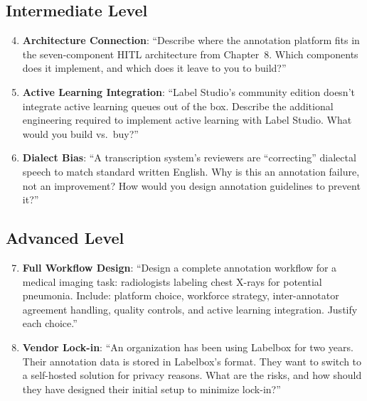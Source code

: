 \subsection{Intermediate Level}

\begin{enumerate}
    \setcounter{enumi}{3}
    \item \textbf{Architecture Connection}: ``Describe where the annotation platform fits in the seven-component HITL architecture from Chapter~8. Which components does it implement, and which does it leave to you to build?''

    \item \textbf{Active Learning Integration}: ``Label Studio's community edition doesn't integrate active learning queues out of the box. Describe the additional engineering required to implement active learning with Label Studio. What would you build vs.\ buy?''

    \item \textbf{Dialect Bias}: ``A transcription system's reviewers are ``correcting'' dialectal speech to match standard written English. Why is this an annotation failure, not an improvement? How would you design annotation guidelines to prevent it?''
\end{enumerate}

\subsection{Advanced Level}

\begin{enumerate}
    \setcounter{enumi}{6}
    \item \textbf{Full Workflow Design}: ``Design a complete annotation workflow for a medical imaging task: radiologists labeling chest X-rays for potential pneumonia. Include: platform choice, workforce strategy, inter-annotator agreement handling, quality controls, and active learning integration. Justify each choice.''

    \item \textbf{Vendor Lock-in}: ``An organization has been using Labelbox for two years. Their annotation data is stored in Labelbox's format. They want to switch to a self-hosted solution for privacy reasons. What are the risks, and how should they have designed their initial setup to minimize lock-in?''
\end{enumerate}

